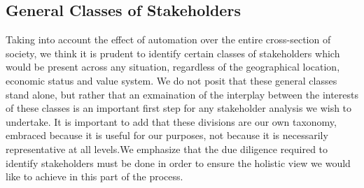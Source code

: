 \subsection{General Classes of Stakeholders}
\label{sec:-general}
Taking into account the effect of automation over the entire cross-section of society, we think it is prudent to identify certain classes of stakeholders which would be present across any situation, regardless of the geographical location, economic status and value system.  We do not posit that these general classes stand alone, but rather that an exmaination of the interplay between the interests of these classes is an important first step for any stakeholder analysis we wish to undertake.
It is important to add that these divisions are our own taxonomy, embraced because it is useful for our purposes, not because it is necessarily representative at all levels.We emphasize that the due diligence required to identify stakeholders must be done in order to ensure the holistic view we would like to achieve in this part of the process.
